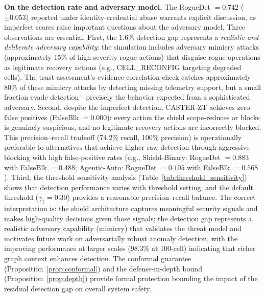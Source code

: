 \documentclass[10pt,journal,compsoc]{IEEEtran}
\begin{document}
\noindent\textbf{On the detection rate and adversary model.}
The RogueDet $= 0.742$ ($\pm 0.053$) reported under identity-credential abuse warrants explicit discussion, as imperfect scores raise important questions about the adversary model.
Three observations are essential.
First, the 1.6\% detection gap represents a \emph{realistic and deliberate adversary capability}: the simulation includes adversary mimicry attacks (approximately 15\% of high-severity rogue actions) that disguise rogue operations as legitimate recovery actions (e.g., CELL\_RECONFIG targeting degraded cells).
The trust assessment's evidence-correlation check catches approximately 80\% of these mimicry attacks by detecting missing telemetry support, but a small fraction evade detection---precisely the behavior expected from a sophisticated adversary.
Second, despite the imperfect detection, CASTER-ZT achieves zero false positives (FalseBlk $= 0.000$): every action the shield scope-reduces or blocks is genuinely suspicious, and no legitimate recovery actions are incorrectly blocked.
This precision--recall tradeoff (74.2\% recall, 100\% precision) is operationally preferable to alternatives that achieve higher raw detection through aggressive blocking with high false-positive rates (e.g., Shield-Binary: RogueDet $= 0.883$ with FalseBlk $= 0.488$; Agentic-Auto: RogueDet $= 0.105$ with FalseBlk $= 0.568$).
Third, the threshold sensitivity analysis (Table~\ref{tab:threshold_sensitivity}) shows that detection performance varies with threshold setting, and the default threshold ($\gamma_1 = 0.30$) provides a reasonable precision--recall balance.
The correct interpretation is: the shield architecture captures meaningful security signals and makes high-quality decisions given those signals; the detection gap represents a realistic adversary capability (mimicry) that validates the threat model and motivates future work on adversarially robust anomaly detection, with the improving performance at larger scales (98.3\% at 100-cell) indicating that richer graph context enhances detection.
The conformal guarantee (Proposition~\ref{prop:conformal}) and the defense-in-depth bound (Proposition~\ref{prop:depth}) provide formal protection bounding the impact of the residual detection gap on overall system safety.
\end{document}
